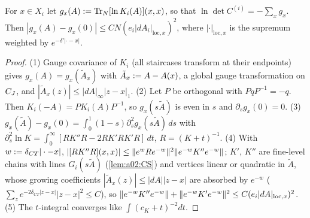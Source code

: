 \begin{lemma}\label{lem:a02:PS}
For $x\in X_i$ let $g_x(A):=\operatorname{Tr}_N[\ln K_i(A)](x,x)$, so that $\ln\det C^{(i)}=-\sum_xg_x$. Then $|g_x(A)-g_x(0)|\le CN(e_i|dA_i|_{\mathrm{loc},x})^2$, where $|\cdot|_{\mathrm{loc},x}$ is the supremum weighted by $e^{-\delta'|\cdot-x|}$.
\end{lemma}
\begin{proof}
(1) Gauge covariance of $K_i$ (all staircases transform at their endpoints) gives $g_x(A)=g_x(\tilde A_x)$ with $\tilde A_x:= A-A(x)$, a global gauge transformation on $C_J$, and $|\tilde A_x(z)|\le|dA|_\infty|z-x|_1$. (2) Let $P$ be orthogonal with $PqP^{-1}=-q$. Then $K_i(-A)=PK_i(A)P^{-1}$, so $g_x(s\tilde A)$ is even in $s$ and $\partial_sg_x(0)=0$. (3) $g_x(\tilde A)-g_x(0)=\int_0^1(1-s)\partial_s^2g_x(s\tilde A)\,ds$ with $\partial_s^2\ln K=\int_0^\infty[RK''R-2RK'RK'R]\,dt$, $R=(K+t)^{-1}$. (4) With $w:=\delta_{CT}|\cdot-x|$, $|[RK''R](x,x)|\le\lVert e^wRe^{-w}\rVert^2\lVert e^{-w}K''e^{-w}\rVert$; $K'$, $K''$ are fine-level chains with lines $G_i(s\tilde A)$ (\cref{lem:a02:CS}) and vertices linear or quadratic in $\tilde A$, whose growing coefficients $|\tilde A_x(z)|\le|dA||z-x|$ are absorbed by $e^{-w}$ ($\sum_ze^{-2\delta_{CT}|z-x|}|z-x|^2\le C$), so $\lVert e^{-w}K''e^{-w}\rVert+\lVert e^{-w}K'e^{-w}\rVert^2\le C(e_i|dA|_{\mathrm{loc},x})^2$. (5) The $t$-integral converges like $\int(c_K+t)^{-2}dt$.
\end{proof}

